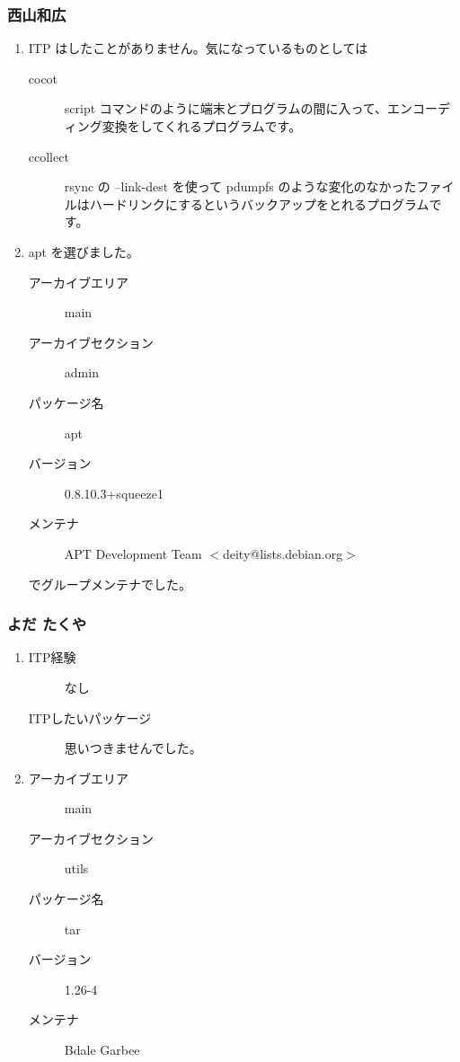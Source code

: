 \documentclass[cjk,dvipdfmx,10pt,%
hyperref={bookmarks=true,bookmarksnumbered=true,bookmarksopen=false,%
colorlinks=false,%
pdftitle={第 59 回 関西 Debian 勉強会},%
pdfauthor={倉敷・のがた・かわだ・佐々木},%
pdfsubject={資料},%
}]{beamer}
\begin{document}
\begin{frame}
  \frametitle{ 西山和広 }
  \begin{enumerate}
  \item ITP はしたことがありません。気になっているものとしては
    \begin{description}
    \item [cocot] script コマンドのように端末とプログラムの間に入って、エンコーディング変換をしてくれるプログラムです。
    \item [ccollect] rsync の --link-dest を使って pdumpfs のような変化のなかったファイルはハードリンクにするというバックアップをとれるプログラムです。
    \end{description}
  \item apt を選びました。
    \begin{description}
    \item [アーカイブエリア] main
    \item [アーカイブセクション] admin
    \item [パッケージ名] apt
    \item [バージョン] 0.8.10.3+squeeze1
    \item [メンテナ] APT Development Team $<$deity@lists.debian.org$>$
    \end{description}
    でグループメンテナでした。
  \end{enumerate}
\end{frame}

\begin{frame}
  \frametitle{ よだ たくや }
  \begin{enumerate}
  \item
    \begin{description}
    \item [ITP経験] なし
    \item [ITPしたいパッケージ] 思いつきませんでした。
    \end{description}
  \item 
    \begin{description}
    \item [アーカイブエリア] main
    \item [アーカイブセクション] utils
    \item [パッケージ名] tar
    \item [バージョン] 1.26-4
    \item [メンテナ] Bdale Garbee
    \end{description}
  \end{enumerate}
\end{frame}
\end{document}
